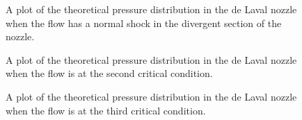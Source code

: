 \begin{figure}[htpb]
    \centering
    
    \caption{A plot of the theoretical pressure distribution in the de Laval nozzle when the flow has a normal shock in the divergent section of the nozzle.}
    \label{fig:theoretical_pressure_normal_shock}
\end{figure}


\begin{figure}[htpb]
    \centering
    
    \caption{A plot of the theoretical pressure distribution in the de Laval nozzle when the flow is at the second critical condition.}
    \label{fig:theoretical_pressure_2nd_critical}
\end{figure}

\begin{figure}[htpb]
    \centering
    
    \caption{A plot of the theoretical pressure distribution in the de Laval nozzle when the flow is at the third critical condition.}
    \label{fig:theoretical_pressure_3rd_critical}
\end{figure}
